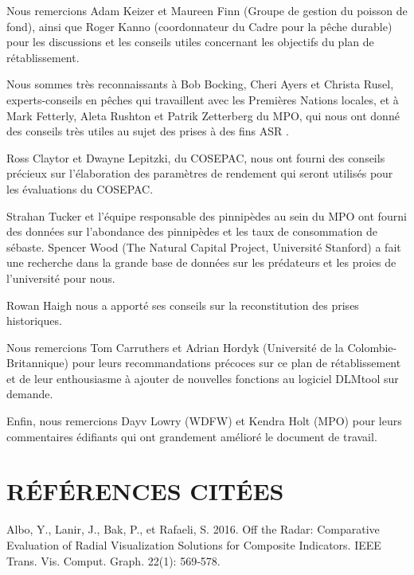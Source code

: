 \documentclass[french,11pt]{book}
\begin{document}
Nous remercions Adam Keizer et Maureen Finn (Groupe de gestion du poisson de fond), ainsi que Roger Kanno (coordonnateur du Cadre pour la pêche durable) pour les discussions et les conseils utiles concernant les objectifs du plan de rétablissement.

Nous sommes très reconnaissants à Bob Bocking, Cheri Ayers et Christa Rusel, experts-conseils en pêches qui travaillent avec les Premières Nations locales, et à Mark Fetterly, Aleta Rushton et Patrik Zetterberg du MPO, qui nous ont donné des conseils très utiles au sujet des prises à des fins ASR .

Ross Claytor et Dwayne Lepitzki, du COSEPAC, nous ont fourni des conseils précieux sur l'élaboration des paramètres de rendement qui seront utilisés pour les évaluations du COSEPAC.

Strahan Tucker et l'équipe responsable des pinnipèdes au sein du MPO ont fourni des données sur l'abondance des pinnipèdes et les taux de consommation de sébaste. Spencer Wood (The Natural Capital Project, Université Stanford) a fait une recherche dans la grande base de données sur les prédateurs et les proies de l'université pour nous.

Rowan Haigh nous a apporté ses conseils sur la reconstitution des prises historiques.

Nous remercions Tom Carruthers et Adrian Hordyk (Université de la Colombie-Britannique) pour leurs recommandations précoces sur ce plan de rétablissement et de leur enthousiasme à ajouter de nouvelles fonctions au logiciel DLMtool sur demande.

Enfin, nous remercions Dayv Lowry (WDFW) et Kendra Holt (MPO) pour leurs commentaires édifiants qui ont grandement amélioré le document de travail.

\clearpage

\hypertarget{ruxe9fuxe9rences-cituxe9es}{%
\section*{RÉFÉRENCES CITÉES}\label{ruxe9fuxe9rences-cituxe9es}}
\noindent
\vspace{-2em}
\setlength{\parindent}{-0.2in}
\setlength{\leftskip}{0.2in}
\setlength{\parskip}{8pt}

\hypertarget{refs}{}
\leavevmode\hypertarget{ref-albo2016}{}%
Albo, Y., Lanir, J., Bak, P., et Rafaeli, S. 2016. Off the Radar: Comparative Evaluation of Radial Visualization Solutions for Composite Indicators. IEEE Trans. Vis. Comput. Graph. 22(1): 569‑578.
\end{document}
